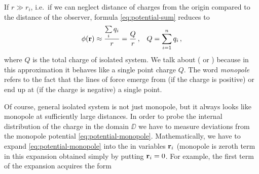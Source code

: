 If $r \gg r_i$, i.e.\ if we can neglect distance of charges from the origin compared to the distance of the observer, formula \eqref{eq:potential-sum} reduces to
\begin{align}\label{eq:potential-monopole}
    \phi(\mathbf{r}) &\approx \frac{\sum\limits_i q_i}{r} = \frac{Q}{r}\, , &
    Q = \sum_{i=1}^n q_i\, ,
\end{align}
where $Q$ is the total charge of isolated system. We talk about  ( or ) because in this approximation it behaves like a single point charge $Q$. The word \emph{monopole} refers to the fact that the lines of force emerge from (if the charge is positive) or end up at (if the charge is negative)  a single point.




Of course, general isolated system is not just monopole, but it always looks like monopole at sufficiently large distances. In order to probe the internal distribution of the charge in the domain $\DD$ we have to measure deviations from the monopole potential \eqref{eq:potential-monopole}. Mathematically, we have to expand \eqref{eq:potential-monopole} into the  in variables $\mathbf{r}_i$ (monopole is zeroth term in this expansion obtained simply by putting $\mathbf{r}_i=0$. For example, the first term of the expansion acquires the form 